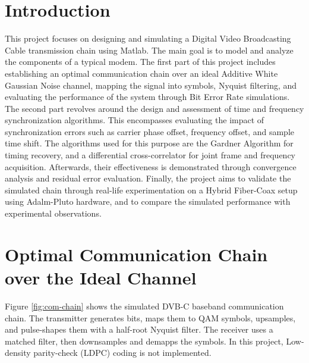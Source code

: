 \documentclass[11pt]{article}
\begin{document}
	\justifying 
	 
	\tableofcontents
	\newpage
	\listoffigures
	\newpage
	\section*{Introduction}{}
	This project focuses on designing and simulating a Digital Video Broadcasting Cable transmission chain using Matlab.
	The main goal is to model and analyze the components of a typical modem. The first part of this project includes establishing an optimal communication chain over an ideal Additive White Gaussian Noise channel, mapping the signal into symbols, Nyquist filtering, and evaluating the performance of the system through Bit Error Rate simulations. The second part revolves around the design and assessment of time and frequency synchronization algorithms. This encompasses evaluating the impact of synchronization errors such as carrier phase offset, frequency offset, and sample time shift. The algorithms used for this purpose are the Gardner Algorithm for timing recovery, and a differential cross-correlator for joint frame and frequency acquisition. Afterwards, their effectiveness is demonstrated through convergence analysis and residual error evaluation. Finally, the project aims to validate the simulated chain through real-life experimentation on a Hybrid Fiber-Coax setup using Adalm-Pluto hardware, and to compare the simulated performance with experimental observations.
	
	
	\section{Optimal Communication Chain over the Ideal Channel}
	Figure \ref{fig:com-chain} shows the simulated DVB-C baseband communication chain. The transmitter generates bits, maps them to QAM symbols, upsamples, and pulse-shapes them with a half-root Nyquist filter. The receiver uses a matched filter, then downsamples and demapps the symbols. In this project, Low-density parity-check (LDPC) coding is not implemented.
	
\end{document}
